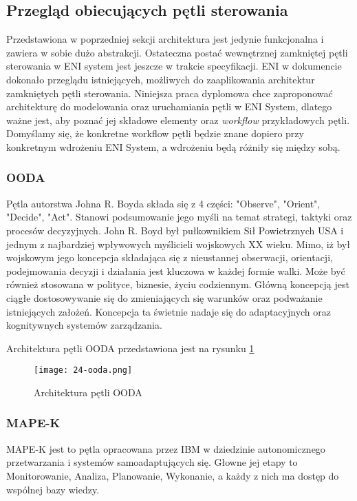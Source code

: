\subsection{Przegląd obiecujących pętli sterowania}

Przedstawiona w poprzedniej sekcji architektura jest jedynie funkcjonalna i zawiera w sobie dużo abstrakcji. Ostateczna postać wewnętrznej zamkniętej pętli sterowania w ENI system jest jeszcze w trakcie specyfikacji. ENI w dokumencie \cite{enioverview} dokonało przeglądu istniejących, możliwych do zaaplikowania architektur zamkniętych pętli sterowania. Niniejsza praca dyplomowa chce zaproponować architekturę do modelowania oraz uruchamiania pętli w ENI System, dlatego ważne jest, aby poznać jej składowe elementy oraz \textit{workflow} przykładowych pętli. Domyślamy się, że konkretne workflow pętli będzie znane dopiero przy konkretnym wdrożeniu ENI System, a wdrożeniu będą różniły się między sobą. 

\subsubsection{OODA}
Pętla autorstwa Johna R. Boyda składa się z 4 części: "Observe", "Orient", "Decide", "Act". Stanowi podsumowanie jego myśli na temat strategi, taktyki oraz procesów decyzyjnych. John R. Boyd był pułkownikiem Sił Powietrznych USA i jednym z najbardziej wpływowych myślicieli wojskowych XX wieku. Mimo, iż był wojskowym jego koncepcja składająca się z nieustannej obserwacji, orientacji, podejmowania decyzji i działania jest kluczowa w każdej formie walki. Może być również stosowana w polityce, biznesie, życiu codziennym. Główną koncepcją jest ciągłe dostosowywanie się do zmieniających się warunków oraz podważanie istniejących założeń. Koncepcja ta świetnie nadaje się do adaptacyjnych oraz kognitywnych systemów zarządzania.

Architektura pętli OODA przedstawiona jest na rysunku \ref{fig:24-ooda}

\begin{figure}[!h]
    \centering \texttt{[image: 24-ooda.png]}
    \caption{Architektura pętli OODA}\label{fig:24-ooda}
\end{figure}


\subsubsection{MAPE-K}
MAPE-K jest to pętla opracowana przez IBM w dziedzinie autonomicznego przetwarzania i systemów samoadaptujących się. Głowne jej etapy to Monitorowanie, Analiza, Planowanie, Wykonanie, a każdy z nich ma dostęp do wspólnej bazy wiedzy. 

